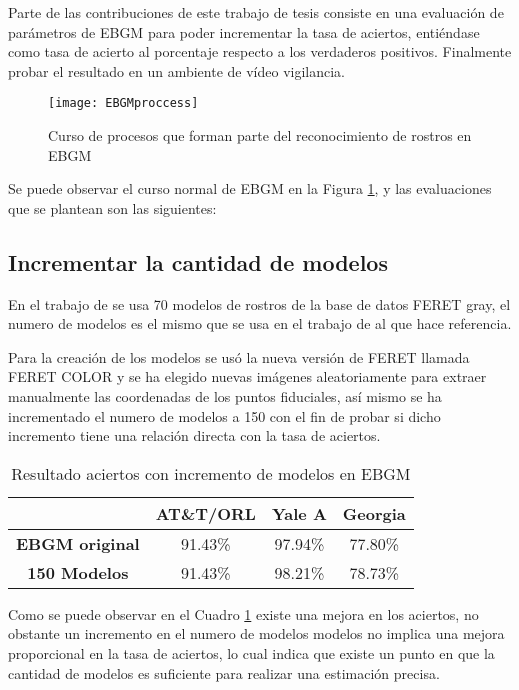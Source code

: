 Parte de las contribuciones de este trabajo de tesis consiste en una evaluación de parámetros de \ac{EBGM} para poder incrementar la tasa de aciertos, entiéndase como tasa de acierto al porcentaje respecto a los verdaderos positivos. Finalmente probar el resultado en un ambiente de vídeo vigilancia.

\begin{figure}[h]
\center
	\texttt{[image: EBGMproccess]}
    \caption{Curso de procesos que forman parte del reconocimiento de rostros en \ac{EBGM}}
    \label{im:parametos}
\end{figure}

Se puede observar el curso normal de \ac{EBGM} en la Figura \ref{im:parametos}, y las evaluaciones que se plantean son las siguientes:

\subsection{Incrementar la cantidad de modelos}
En el trabajo de \cite{bolme2003elastic} se usa 70 modelos de rostros de la base de datos FERET gray, el numero de modelos es el mismo que se usa en el trabajo de \cite{wiskott1997face} al que hace referencia.

Para la creación de los modelos se usó la nueva versión de FERET llamada FERET COLOR y se ha elegido nuevas imágenes aleatoriamente para extraer manualmente las coordenadas de los puntos fiduciales, así mismo se ha incrementado el numero de modelos a 150 con el fin de probar si dicho incremento tiene una relación directa con la tasa de aciertos.

\begin{table}[h]
\centering
\caption{Resultado aciertos con incremento de modelos en \ac{EBGM}}
\label{ta:ModelInc}
\begin{tabular}{|c|c|c|c|}
\hline 
                     & \textbf{AT\&T/ORL} & \textbf{Yale A} & \textbf{Georgia} \\ \hline
\textbf{\ac{EBGM} original}  & 91.43\%            & 97.94\%         & 77.80\%          \\ \hline
\textbf{150 Modelos}         & 91.43\%            & 98.21\%         & 78.73\%          \\ \hline
\end{tabular}
\end{table}

Como se puede observar en el Cuadro \ref{ta:ModelInc} existe una mejora en los aciertos, no obstante un incremento en el numero de modelos modelos no implica una mejora proporcional en la tasa de aciertos, lo cual indica que existe un punto en que la cantidad de modelos es suficiente para realizar una estimación precisa.

